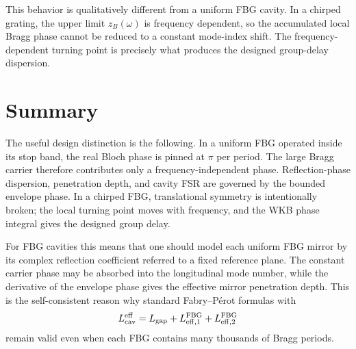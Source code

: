\documentclass[aps,pra,twocolumn,superscriptaddress,nofootinbib]{revtex4-2}
\newcommand{\eff}{\mathrm{eff}}
\begin{document}
This behavior is qualitatively different from a uniform FBG cavity.  In a chirped grating, the upper limit $z_B(\omega)$ is frequency dependent, so the accumulated local Bragg phase cannot be reduced to a constant mode-index shift.  The frequency-dependent turning point is precisely what produces the designed group-delay dispersion.

\section{Summary}

The useful design distinction is the following.  In a uniform FBG operated inside its stop band, the real Bloch phase is pinned at $\pi$ per period.  The large Bragg carrier therefore contributes only a frequency-independent phase.  Reflection-phase dispersion, penetration depth, and cavity FSR are governed by the bounded envelope phase.  In a chirped FBG, translational symmetry is intentionally broken; the local turning point moves with frequency, and the WKB phase integral gives the designed group delay.

For FBG cavities this means that one should model each uniform FBG mirror by its complex reflection coefficient referred to a fixed reference plane.  The constant carrier phase may be absorbed into the longitudinal mode number, while the derivative of the envelope phase gives the effective mirror penetration depth.  This is the self-consistent reason why standard Fabry--P\'erot formulas with
\begin{equation}
    L_{\rm cav}^{\eff}=L_{\rm gap}+L_{\eff,1}^{\rm FBG}+L_{\eff,2}^{\rm FBG}
\end{equation}
remain valid even when each FBG contains many thousands of Bragg periods.

\appendix
\end{document}
